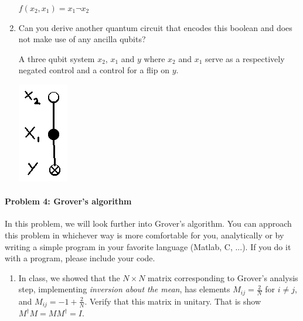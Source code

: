 \documentclass[12pt]{article}
\newenvironment{answer}{\begingroup\setlength{\leftskip}{-\leftmargin}\begin{framed}}{\end{framed}\endgroup}
\begin{document}
\begin{enumerate}
	\begin{answer}
		$f(x_2, x_1) = x_{1}\neg{}x_2$
	\end{answer}

	\item Can you derive another quantum circuit that encodes this boolean and does not make use of any ancilla qubits?

	\begin{answer}
		A three qubit system $x_2$, $x_1$ and $y$ where $x_2$ and $x_1$ serve as a respectively negated control and a control for a flip on $y$. 

		\begin{center}\includegraphics[width=.3\textwidth]{problem-3-5.png}\end{center}
	\end{answer}
\end{enumerate}

\paragraph{Problem 4: Grover's algorithm}

In this problem, we will look further into Grover's algorithm. You can approach this problem in whichever way is more comfortable for you, analytically or by writing a simple program in your favorite language (Matlab, C, ...). If you do it with a program, please include your code.

\begin{enumerate}
 	\item In class, we showed that the $N \times N$ matrix corresponding to Grover's analysis step, implementing \emph{inversion about the mean}, has elements $M_{ij} = \frac{2}{N}$ for $i \neq j$, and $M_{ij} = -1 + \frac{2}{N}$. Verify that this matrix in unitary. That is show $M^\dagger{}M = MM^\dagger = I$. 
 	
 \end{enumerate} 
\end{document}
